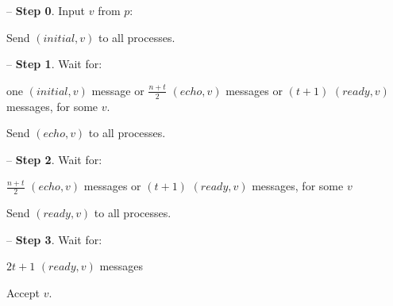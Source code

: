 \begin{bbox}[title={\textbf{Protocol} Async-Bracha-Broadcast$(v)$}]

-- {\bf Step 0}. Input $v$ from $p$:
	
	\qquad Send $(initial,v)$ to all processes.

-- {\bf Step 1}. Wait for:
	
	\qquad one $(initial, v)$ message or $\frac{n+t}{2}$ $(echo,v)$ messages or $(t+1)$ $(ready,v)$ messages, for some $v$.

	\qquad Send $(echo,v)$ to all processes.

-- {\bf Step 2}. Wait for:
	
	\qquad $\frac{n+t}{2}$ $(echo,v)$ messages or $(t+1)$ $(ready,v)$ messages, for some $v$

	\qquad Send $(ready,v)$ to all processes.

-- {\bf Step 3}. Wait for:

	\qquad $2t+1$ $(ready,v)$ messages

	\qquad Accept $v$.

\end{bbox}
